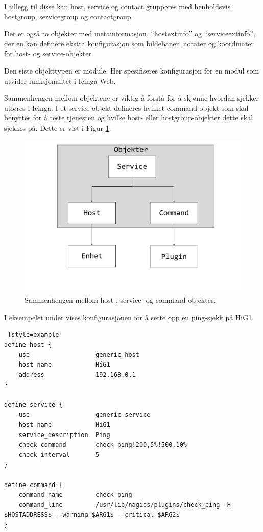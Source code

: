 I tillegg til disse kan host, service og contact grupperes med henholdsvis hostgroup, servicegroup og contactgroup.

Det er også to objekter med metainformasjon, ``hostextinfo'' og ``serviceextinfo'', der en kan definere ekstra konfigurasjon som bildebaner, notater og koordinater for host- og service-objekter.

Den siste objekttypen er module. Her spesifiseres konfigurasjon for en modul som utvider funksjonalitet i Icinga Web.

Sammenhengen mellom objektene er viktig å forstå for å skjønne hvordan sjekker utføres i Icinga. I et service-objekt defineres hvilket command-objekt som skal benyttes for å teste tjenesten og hvilke host- eller hostgroup-objekter dette skal sjekkes på. Dette er vist i Figur \ref{command_host_service}.

\begin{figure}[H]
    \centering
    \includegraphics[scale=0.4]{img/command_host_service}
    \caption{Sammenhengen mellom host-, service- og command-objekter.}
    \label{command_host_service}
\end{figure}
I eksempelet under vises konfigurasjonen for å sette opp en ping-sjekk på HiG1.
\begin{lstlisting} [style=example]
define host {
    use                  generic_host
    host_name            HiG1
    address              192.168.0.1
}

define service {
    use	                 generic_service
    host_name            HiG1
    service_description  Ping
    check_command        check_ping!200,5%!500,10%
    check_interval       5
}

define command {
    command_name         check_ping
    command_line         /usr/lib/nagios/plugins/check_ping -H $HOSTADDRESS$ --warning $ARG1$ --critical $ARG2$   
}
\end{lstlisting}


